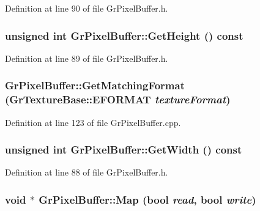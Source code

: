 \begin{CompactItemize}
Definition at line 90 of file GrPixelBuffer.h.\hypertarget{class_gr_pixel_buffer_da17c29389e6c5b49902dd22db3b3a1a}{
\subsubsection[{GetHeight}]{\setlength{\rightskip}{0pt plus 5cm}unsigned int GrPixelBuffer::GetHeight () const}}
\label{class_gr_pixel_buffer_da17c29389e6c5b49902dd22db3b3a1a}




Definition at line 89 of file GrPixelBuffer.h.\hypertarget{class_gr_pixel_buffer_ebc2dc93c5179b6d41160bb89247dfed}{
\subsubsection[{GetMatchingFormat}]{ GrPixelBuffer::GetMatchingFormat ({\bf GrTextureBase::EFORMAT} {\em textureFormat})}}
\label{class_gr_pixel_buffer_ebc2dc93c5179b6d41160bb89247dfed}




Definition at line 123 of file GrPixelBuffer.cpp.\hypertarget{class_gr_pixel_buffer_5127f030a3b0afa23b3904684d17149d}{
\subsubsection[{GetWidth}]{\setlength{\rightskip}{0pt plus 5cm}unsigned int GrPixelBuffer::GetWidth () const}}
\label{class_gr_pixel_buffer_5127f030a3b0afa23b3904684d17149d}




Definition at line 88 of file GrPixelBuffer.h.\hypertarget{class_gr_pixel_buffer_114b4356b7c8aa5fa2d301d91e457f0d}{
\subsubsection[{Map}]{\setlength{\rightskip}{0pt plus 5cm}void $\ast$ GrPixelBuffer::Map (bool {\em read}, \/  bool {\em write})}}
\label{class_gr_pixel_buffer_114b4356b7c8aa5fa2d301d91e457f0d}





\end{CompactItemize}
